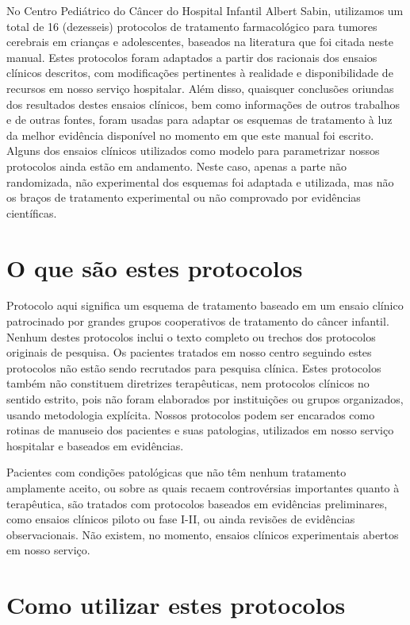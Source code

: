 \documentclass[11pt,a4paper,oldfontcommands]{memoir}
\begin{document}
No Centro Pediátrico do Câncer do Hospital Infantil Albert Sabin, utilizamos um total de 16 (dezesseis) protocolos de tratamento farmacológico para tumores cerebrais em crianças e adolescentes, baseados na literatura que foi citada neste manual. Estes protocolos foram adaptados a partir dos racionais dos ensaios clínicos descritos, com modificações pertinentes à realidade e disponibilidade de recursos em nosso serviço hospitalar. Além disso, quaisquer conclusões oriundas dos resultados destes ensaios clínicos, bem como informações de outros trabalhos e de outras fontes, foram usadas para adaptar os esquemas de tratamento à luz da melhor evidência disponível no momento em que este manual foi escrito. Alguns dos ensaios clínicos utilizados como modelo para parametrizar nossos protocolos ainda estão em andamento. Neste caso, apenas a parte não randomizada, não experimental dos esquemas foi adaptada e utilizada, mas não os braços de tratamento experimental ou não comprovado por evidências científicas.

\section{O que são estes protocolos}

Protocolo aqui significa um esquema de tratamento baseado em um ensaio clínico patrocinado por grandes grupos cooperativos de tratamento do câncer infantil. Nenhum destes protocolos inclui o texto completo ou trechos dos protocolos originais de pesquisa. Os pacientes tratados em nosso centro seguindo estes protocolos não estão sendo recrutados para pesquisa clínica. Estes protocolos também não constituem diretrizes terapêuticas, nem protocolos clínicos no sentido estrito, pois não foram elaborados por instituições ou grupos organizados, usando metodologia explícita. Nossos protocolos podem ser encarados como rotinas de manuseio dos pacientes e suas patologias, utilizados em nosso serviço hospitalar e baseados em evidências.

Pacientes com condições patológicas que não têm nenhum tratamento amplamente aceito, ou sobre as quais recaem controvérsias importantes quanto à terapêutica, são tratados com  protocolos baseados em evidências preliminares, como ensaios clínicos piloto ou fase I-II, ou ainda revisões de evidências observacionais. Não existem, no momento, ensaios clínicos experimentais abertos em nosso serviço. 

\section{Como utilizar estes protocolos}
\end{document}

